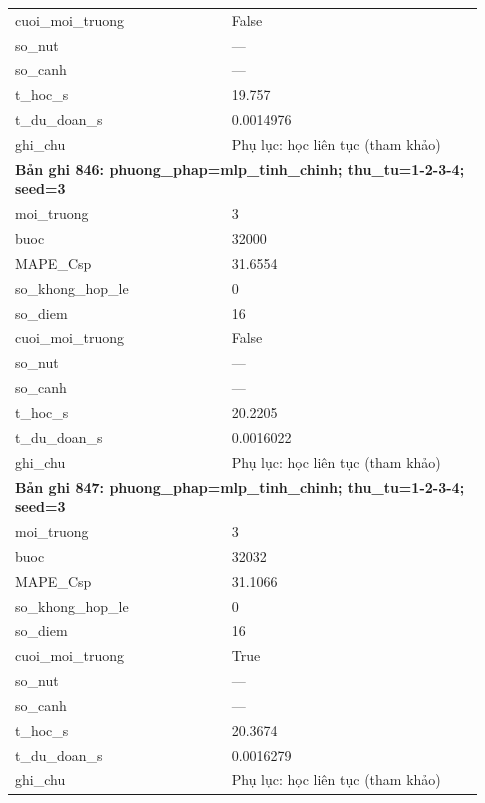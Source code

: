 \begin{longtable}{p{0.43\linewidth}p{0.50\linewidth}}
cuoi\_\allowbreak moi\_\allowbreak truong & False \\
so\_\allowbreak nut & — \\
so\_\allowbreak canh & — \\
t\_\allowbreak hoc\_\allowbreak s & 19.757 \\
t\_\allowbreak du\_\allowbreak doan\_\allowbreak s & 0.0014976 \\
ghi\_\allowbreak chu & Phụ lục: học liên tục (tham khảo) \\
\midrule
\multicolumn{2}{p{0.95\linewidth}}{\textbf{Bản ghi 846: phuong\_phap=mlp\_tinh\_chinh; thu\_tu=1-2-3-4; seed=3}} \\
moi\_\allowbreak truong & 3 \\
buoc & 32000 \\
MAPE\_\allowbreak Csp & 31.6554 \\
so\_\allowbreak khong\_\allowbreak hop\_\allowbreak le & 0 \\
so\_\allowbreak diem & 16 \\
cuoi\_\allowbreak moi\_\allowbreak truong & False \\
so\_\allowbreak nut & — \\
so\_\allowbreak canh & — \\
t\_\allowbreak hoc\_\allowbreak s & 20.2205 \\
t\_\allowbreak du\_\allowbreak doan\_\allowbreak s & 0.0016022 \\
ghi\_\allowbreak chu & Phụ lục: học liên tục (tham khảo) \\
\midrule
\multicolumn{2}{p{0.95\linewidth}}{\textbf{Bản ghi 847: phuong\_phap=mlp\_tinh\_chinh; thu\_tu=1-2-3-4; seed=3}} \\
moi\_\allowbreak truong & 3 \\
buoc & 32032 \\
MAPE\_\allowbreak Csp & 31.1066 \\
so\_\allowbreak khong\_\allowbreak hop\_\allowbreak le & 0 \\
so\_\allowbreak diem & 16 \\
cuoi\_\allowbreak moi\_\allowbreak truong & True \\
so\_\allowbreak nut & — \\
so\_\allowbreak canh & — \\
t\_\allowbreak hoc\_\allowbreak s & 20.3674 \\
t\_\allowbreak du\_\allowbreak doan\_\allowbreak s & 0.0016279 \\
ghi\_\allowbreak chu & Phụ lục: học liên tục (tham khảo) \\

\end{longtable}
